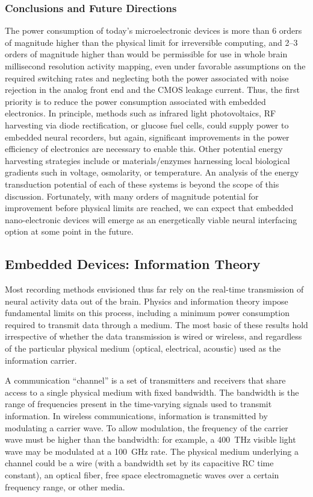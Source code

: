 \subsubsection{Conclusions and Future Directions}
The power consumption of today's microelectronic devices is more than 6 orders of magnitude higher than the physical limit for irreversible computing, and 2--3 orders of magnitude higher than would be permissible for use in whole brain millisecond resolution activity mapping, even under favorable assumptions on the required switching rates and neglecting both the power associated with noise rejection in the analog front end and the CMOS leakage current.
Thus, the first priority is to reduce the power consumption associated with embedded electronics.
In principle, methods such as infrared light photovoltaics, RF harvesting via diode rectification, or glucose fuel cells, could supply power to embedded neural recorders, but again, significant improvements in the power efficiency of electronics are necessary to enable this.
Other potential energy harvesting strategies include or materials/enzymes harnessing local biological gradients such in voltage, osmolarity, or temperature.
An analysis of the energy transduction potential of each of these systems is beyond the scope of this discussion.
Fortunately, with many orders of magnitude potential for improvement before physical limits are reached, we can expect that embedded nano-electronic devices will emerge as an energetically viable neural interfacing option at some point in the future.

\subsection{Embedded Devices: Information Theory}

Most recording methods envisioned thus far rely on the real-time transmission of neural activity data out of the brain.
Physics and information theory impose fundamental limits on this process, including a minimum power consumption required to transmit data through a medium.
The most basic of these results hold irrespective of whether the data transmission is wired or wireless, and regardless of the particular physical medium (optical, electrical, acoustic) used as the information carrier.

A communication ``channel'' is a set of transmitters and receivers that share access to a single physical medium with fixed bandwidth.
The bandwidth is the range of frequencies present in the time-varying signals used to transmit information.
In wireless communications, information is transmitted by modulating a carrier wave.
To allow modulation, the frequency of the carrier wave must be higher than the bandwidth: for example, a \SI{400}{\tera\hertz} visible light wave may be modulated at a \SI{100}{\giga\hertz} rate.
The physical medium underlying a channel could be a wire (with a bandwidth set by its capacitive RC time constant), an optical fiber, free space electromagnetic waves over a certain frequency range, or other media.

